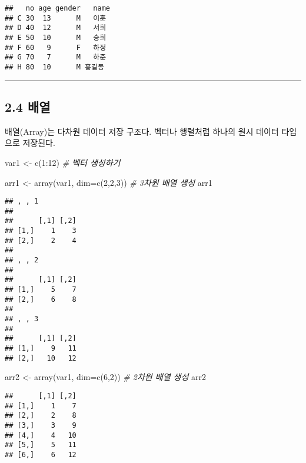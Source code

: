 \documentclass[
]{article}
\newenvironment{Shaded}{\begin{snugshade}}{\end{snugshade}}
\newcommand{\AttributeTok}[1]{\textcolor[rgb]{0.77,0.63,0.00}{#1}}
\newcommand{\CommentTok}[1]{\textcolor[rgb]{0.56,0.35,0.01}{\textit{#1}}}
\newcommand{\DecValTok}[1]{\textcolor[rgb]{0.00,0.00,0.81}{#1}}
\newcommand{\FunctionTok}[1]{\textcolor[rgb]{0.00,0.00,0.00}{#1}}
\newcommand{\NormalTok}[1]{#1}
\newcommand{\OtherTok}[1]{\textcolor[rgb]{0.56,0.35,0.01}{#1}}
\newcommand{\SpecialCharTok}[1]{\textcolor[rgb]{0.00,0.00,0.00}{#1}}
\begin{document}
\begin{verbatim}
##   no age gender   name
## C 30  13      M   이훈
## D 40  12      M   서희
## E 50  10      M   승희
## F 60   9      F   하정
## G 70   7      M   하준
## H 80  10      M 홍길동
\end{verbatim}

\begin{center}\rule{0.5\linewidth}{0.5pt}\end{center}

\hypertarget{uxbc30uxc5f4}{%
\subsection{2.4 배열}\label{uxbc30uxc5f4}}

배열(Array)는 다차원 데이터 저장 구조다. 벡터나 행렬처럼 하나의 원시
데이터 타입으로 저장된다.

\begin{Shaded}
\begin{Highlighting}[]
\NormalTok{var1 }\OtherTok{\textless{}{-}} \FunctionTok{c}\NormalTok{(}\DecValTok{1}\SpecialCharTok{:}\DecValTok{12}\NormalTok{)  }\CommentTok{\# 벡터 생성하기}

\NormalTok{arr1 }\OtherTok{\textless{}{-}} \FunctionTok{array}\NormalTok{(var1, }\AttributeTok{dim=}\FunctionTok{c}\NormalTok{(}\DecValTok{2}\NormalTok{,}\DecValTok{2}\NormalTok{,}\DecValTok{3}\NormalTok{))    }\CommentTok{\# 3차원 배열 생성}
\NormalTok{arr1}
\end{Highlighting}
\end{Shaded}

\begin{verbatim}
## , , 1
## 
##      [,1] [,2]
## [1,]    1    3
## [2,]    2    4
## 
## , , 2
## 
##      [,1] [,2]
## [1,]    5    7
## [2,]    6    8
## 
## , , 3
## 
##      [,1] [,2]
## [1,]    9   11
## [2,]   10   12
\end{verbatim}

\begin{Shaded}
\begin{Highlighting}[]
\NormalTok{arr2 }\OtherTok{\textless{}{-}} \FunctionTok{array}\NormalTok{(var1, }\AttributeTok{dim=}\FunctionTok{c}\NormalTok{(}\DecValTok{6}\NormalTok{,}\DecValTok{2}\NormalTok{))      }\CommentTok{\# 2차원 배열 생성}
\NormalTok{arr2}
\end{Highlighting}
\end{Shaded}

\begin{verbatim}
##      [,1] [,2]
## [1,]    1    7
## [2,]    2    8
## [3,]    3    9
## [4,]    4   10
## [5,]    5   11
## [6,]    6   12
\end{verbatim}
\end{document}
